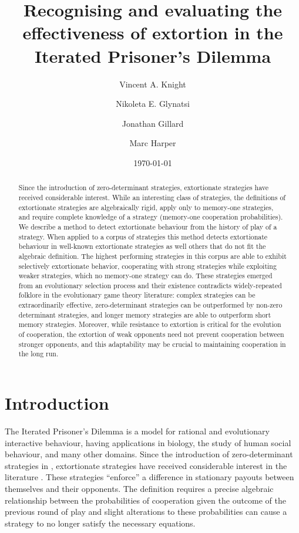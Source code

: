 \documentclass[a4paper]{article}
\title{Recognising and evaluating the effectiveness
       of extortion in the Iterated Prisoner's Dilemma}
\author{Vincent A. Knight \and
        Nikoleta E. Glynatsi \and
        Jonathan Gillard \and
        Marc Harper}
\date{\today}
\begin{document}
\maketitle

\begin{abstract}

Since the introduction of zero-determinant strategies, extortionate strategies
have received considerable interest. While an interesting class of strategies,
the definitions of extortionate strategies are algebraically rigid, apply only
to memory-one strategies, and require complete knowledge of a strategy (memory-one
cooperation probabilities). We describe a method to detect extortionate
behaviour from the history of play of a strategy. When applied to a corpus of
strategies this method
detects extortionate behaviour in well-known extortionate strategies as well
others that do not fit the algebraic definition. The highest performing
strategies in this corpus are able to exhibit selectively extortionate behavior,
cooperating with strong strategies while exploiting weaker strategies, which no
memory-one strategy can do. These strategies emerged from an evolutionary
selection process and their existence contradicts widely-repeated folklore in
the evolutionary game theory literature: complex strategies can be
extraordinarily effective, zero-determinant strategies can be outperformed by
non-zero determinant strategies, and longer memory strategies are able to
outperform short memory strategies. Moreover, while resistance to extortion is
critical for the evolution of cooperation, the extortion of weak opponents
need not prevent cooperation between stronger opponents, and this adaptability
may be crucial to maintaining cooperation in the long run.
\end{abstract}

\section{Introduction}\label{sec:introduction}

The Iterated Prisoner's Dilemma is a model for rational and evolutionary
interactive behaviour, having applications in biology, the study of human
social behaviour, and many other domains. Since the introduction of
zero-determinant strategies in \cite{press2012}, extortionate strategies have
received considerable interest in the literature \cite{hilbe2015partners}.
These strategies ``enforce'' a difference in stationary
payouts between themselves and their opponents. The definition requires a
precise algebraic relationship between the probabilities of cooperation given
the outcome of the previous round of play and slight alterations to these
probabilities can cause a strategy to no longer satisfy the necessary equations.
\end{document}
